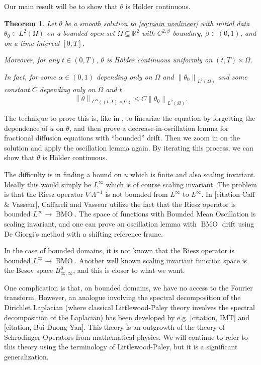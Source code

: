 \documentclass[11pt]{amsart}
\newtheorem{theorem}{Theorem}[section]
\theoremstyle{remark}
\theoremstyle{definition}
\newcommand{\R}{\mathbb{R}}
\newcommand{\norm}[1]{\left\lVert#1\right\rVert}
\DeclareMathOperator{\BMO}{BMO}
\newcommand{\grad}{\nabla}
\begin{document}
Our main result will be to show that $\theta$ is H\"{o}lder continuous.  

\begin{theorem} \label{thm:main continuity}
Let $\theta$ be a smooth solution to \eqref{eq:main nonlinear} with initial data $\theta_0 \in L^2(\Omega)$ on a bounded open set $\Omega \subseteq \R^2$ with $C^{2,\beta}$ boundary, $\beta \in (0,1)$, and on a time interval $[0,T]$.  

Moreover, for any $t \in (0,T)$, $\theta$ is H\"{o}lder continuous uniformly on $(t,T)\times\Omega$.  

In fact, for some $\alpha \in (0,1)$ depending only on $\Omega$ and $\norm{\theta_0}_{L^2(\Omega)}$ and some constant $C$ depending only on $\Omega$ and $t$
\[ \norm{\theta}_{C^\alpha((t,T)\times\Omega)} \leq C \norm{\theta_0}_{L^2(\Omega)}. \]
\end{theorem}

The technique to prove this is, like in \cite{CaVa}, to linearize the equation by forgetting the dependence of $u$ on $\theta$, and then prove a decrease-in-oscillation lemma for fractional diffusion equations with ``bounded'' drift.  Then we zoom in on the solution and apply the oscillation lemma again.  By iterating this process, we can show that $\theta$ is H\"{o}lder continuous.  

The difficulty is in finding a bound on $u$ which is finite and also scaling invariant.  Ideally this would simply be $L^\infty$ which is of course scaling invariant.  The problem is that the Riesz operator $\grad \Lambda^{-1}$ is not bounded from $L^\infty$ to $L^\infty$.  In [citation Caff \& Vasseur], Caffareli and Vasseur utilize the fact that the Riesz operator is bounded $L^\infty \to \BMO$.  The space of functions with Bounded Mean Oscillation is scaling invariant, and one can prove an oscillation lemma with $\BMO$ drift using De Giorgi's method with a shifting reference frame.  

In the case of bounded domains, it is not known that the Riesz operator is bounded $L^\infty \to \BMO$.  Another well known scaling invariant function space is the Besov space $B^0_{\infty,\infty}$, and this is closer to what we want.  

One complication is that, on bounded domains, we have no access to the Fourier transform.  However, an analogue involving the spectral decomposition of the Dirichlet Laplacian (where classical Littlewood-Paley theory involves the spectral decomposition of the Laplacian) has been developed by e.g. [citation, IMT] and [citation, Bui-Duong-Yan].  This theory is an outgrowth of the theory of Schrodinger Operators from mathematical physics.  We will continue to refer to this theory using the terminology of Littlewood-Paley, but it is a significant generalization.  
\end{document}
